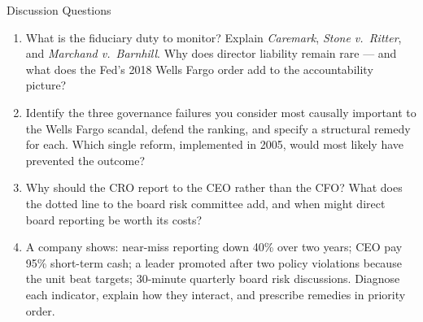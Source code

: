 \documentclass[11pt, aspectratio=169]{beamer}
\begin{document}
\begin{frame}{Discussion Questions}
\begin{enumerate}
  \item What is the fiduciary duty to monitor? Explain \emph{Caremark}, \emph{Stone v.\ Ritter}, and \emph{Marchand v.\ Barnhill}. Why does director liability remain rare --- and what does the Fed's 2018 Wells Fargo order add to the accountability picture?
  \item Identify the three governance failures you consider most causally important to the Wells Fargo scandal, defend the ranking, and specify a structural remedy for each. Which single reform, implemented in 2005, would most likely have prevented the outcome?
  \item Why should the CRO report to the CEO rather than the CFO? What does the dotted line to the board risk committee add, and when might direct board reporting be worth its costs?
  \item A company shows: near-miss reporting down 40\% over two years; CEO pay 95\% short-term cash; a leader promoted after two policy violations because the unit beat targets; 30-minute quarterly board risk discussions. Diagnose each indicator, explain how they interact, and prescribe remedies in priority order.
\end{enumerate}
\end{frame}
\end{document}
